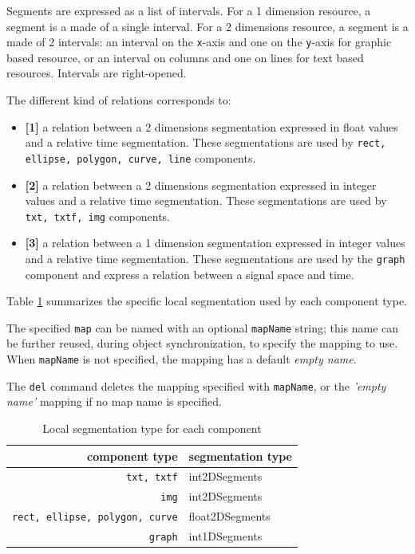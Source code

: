 \documentclass[a4paper,twoside]{report}
\newcommand{\OSC}[1]		{\texttt{#1}}
\newcommand{\values}[1]	{\texttt{#1}}
\begin{document}
Segments are expressed as a list of intervals. For a 1 dimension resource, a segment is a made of a single interval. For a 2 dimensions resource, a segment is a made of 2 intervals: an interval on the \values{x}-axis and one on the \values{y}-axis for graphic based resource, or an interval on columns and one on lines for text based resources. Intervals are right-opened.

The different kind of relations corresponds to:
\begin{itemize}
\item \textbf{[1]} a relation between a 2 dimensions segmentation expressed in float values and a relative time segmentation. These segmentations are used by \OSC{rect, ellipse, polygon, curve, line} components.
\item \textbf{[2]} a relation between a 2 dimensions segmentation expressed in integer values and a relative time segmentation. These segmentations are used by \OSC{txt, txtf, img} components. 
\item \textbf{[3]} a relation between a 1 dimension segmentation expressed in integer values and a relative time segmentation. These segmentations are used by the \OSC{graph} component and express a relation between a signal space and time.
\end{itemize}
Table \ref{maptable} summarizes the specific local segmentation used by each component type. 

The specified \OSC{map} can be named with an optional \OSC{mapName} string; this name can be further reused, during object synchronization, to specify the mapping to use. When \OSC{mapName} is not specified, the mapping has a default \emph{empty name}.

The \OSC{del} command deletes the mapping specified with \OSC{mapName}, or the \emph{'empty name'} mapping if no map name is specified.


\begin{table}[htdp]
\caption{Local segmentation type for each component}
\begin{center}
\begin{tabular}{|r|l|}
\hline
component type & segmentation type \\
\hline
\OSC{txt, txtf}		& int2DSegments \\
\OSC{img}			& int2DSegments \\
\OSC{rect, ellipse, polygon, curve}	&  float2DSegments \\
\OSC{graph}			&  int1DSegments \\
\hline
\end{tabular}
\end{center}
\label{maptable}
\end{table}
\end{document}

